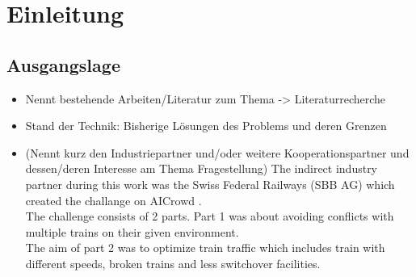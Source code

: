 %
%

\chapter{Einleitung}\label{chap.einleitung}


\section{Ausgangslage}\label{ausgangslage}

\begin{itemize}
\item Nennt bestehende Arbeiten/Literatur zum Thema -> Literaturrecherche
\item Stand der Technik: Bisherige Lösungen des Problems und deren Grenzen
\item (Nennt kurz den Industriepartner und/oder weitere Kooperationspartner und dessen/deren Interesse am Thema Fragestellung)
The indirect industry partner during this work was the Swiss Federal Railways (SBB AG) which created the challange on AICrowd \cite{Test}.\\ 
The challenge consists of 2 parts. Part 1 was about avoiding conflicts with multiple trains on their given environment. \\
The aim of part 2 was to optimize train traffic which includes train with different speeds, broken trains and less switchover facilities.\\
\end{itemize}



